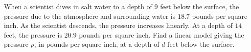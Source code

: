 When a scientist dives in salt water to a depth of $9$ feet below the surface, the pressure due to the atmosphere and surrounding water is $18.7$ pounds per square inch. As the scientist descends, the pressure increases linearly. At a depth of $14$ feet, the pressure is $20.9$ pounds per square inch. Find a linear model giving the pressure $p$, in pounds per square inch, at a depth of $d$ feet below the surface.
